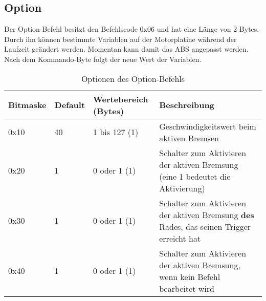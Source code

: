 \subsection{Option}
Der Option-Befehl besitzt den Befehlscode 0x06 und hat eine Länge von 2 Bytes.
Durch ihn können bestimmte Variablen auf der Motorplatine während der Laufzeit
geändert werden. Momentan kann damit das ABS angepasst werden. Nach dem
Kommando-Byte folgt der neue Wert der Variablen.
\begin{table}[htb]
\begin{center}
	\begin{tabularx}{\linewidth}{|l|l|l|X|}
		\hline
		\textbf{Bitmaske} & \textbf{Default} & \textbf{Wertebereich (Bytes)} & \textbf{Beschreibung} \\
		\hline
		\hline
		0x10 & 40 & 1 bis 127 (1) & Geschwindigkeitswert beim aktiven Bremsen\\
		\hline
		0x20 & 1 & 0 oder 1 (1) & Schalter zum Aktivieren der aktiven Bremsung (eine 1 bedeutet die Aktivierung)\\
		\hline
		0x30 & 1 & 0 oder 1 (1) & Schalter zum Aktivieren der aktiven Bremsung \textbf{des} Rades, das seinen Trigger erreicht hat\\
		\hline
		0x40 & 1 & 0 oder 1 (1) & Schalter zum Aktivieren der aktiven Bremsung, wenn kein Befehl bearbeitet wird\\
		\hline
	\end{tabularx}
	\caption{\label{protocol_option} Optionen des Option-Befehls}
\end{center}
\end{table}
